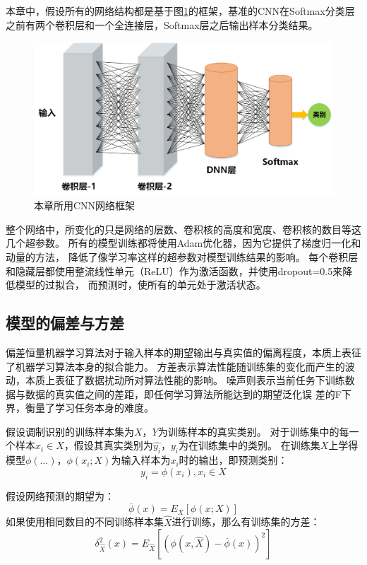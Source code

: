 本章中，假设所有的网络结构都是基于图\ref{fig_5_0}的框架，基准的CNN在Softmax分类层之前有两个卷积层和一个全连接层，Softmax层之后输出样本分类结果。\par
\begin{figure}[!h]
	\centering
	\includegraphics[scale=0.6]{figures/chapter_5/fig_5_0}
	\caption{本章所用CNN网络框架}
	\label{fig_5_0}
\end{figure}

整个网络中，所变化的只是网络的层数、卷积核的高度和宽度、卷积核的数目等这几个超参数。
所有的模型训练都将使用Adam优化器，因为它提供了梯度归一化和动量的方法，
降低了像学习率这样的超参数对模型训练结果的影响。
每个卷积层和隐藏层都使用整流线性单元（ReLU）作为激活函数，并使用dropout=0.5来降低模型的过拟合，
而预测时，使所有的单元处于激活状态。\par

\subsection{模型的偏差与方差}
\label{sec_5_2_1}
偏差恒量机器学习算法对于输入样本的期望输出与真实值的偏离程度，本质上表征了机器学习算法本身的拟合能力。
方差表示算法性能随训练集的变化而产生的波动，本质上表征了数据扰动所对算法性能的影响。
噪声则表示当前任务下训练数据与数据的真实值之间的差距，即任何学习算法所能达到的期望泛化误
差的F下界，衡量了学习任务本身的难度。\par

假设调制识别的训练样本集为$X$，$Y$为训练样本的真实类别。
对于训练集中的每一个样本$x_i \in X$，假设其真实类别为$\hat{y_i}$，$y_i$为在训练集中的类别。
在训练集$X$上学得模型$\phi(\dots)$，$\phi(x_i; X)$为输入样本为$x_i$时的输出，即预测类别：
\begin{equation}
	\label{eqt_5_2}
	y_i = \phi(x_i), x_i \in X
\end{equation}

假设网络预测的期望为：
\begin{equation}
	\label{eqt_5_3}
	\overline{\phi}(x) = E_X\left[ \phi(x; X) \right]
\end{equation}
如果使用相同数目的不同训练样本集$\hat{X}$进行训练，那么有训练集的方差：
\begin{equation}
	\label{eqt_5_4}
	\delta_{\hat{X}}^2(x) = E_{\hat{X}}\left[ (\phi(x, \hat{X}) - \overline{\phi}(x))^2\right]
\end{equation}

